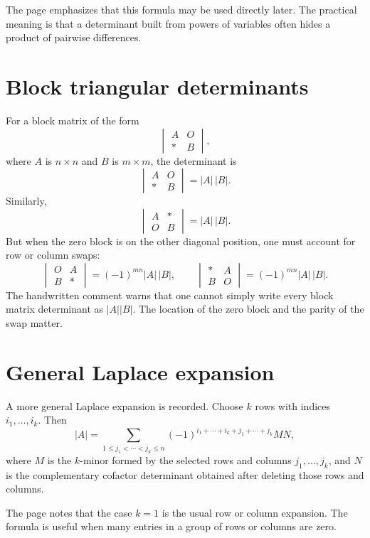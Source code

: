 The page emphasizes that this formula may be used directly later.  The practical meaning is that a determinant built from powers of variables often hides a product of pairwise differences.

\section{Block triangular determinants}

For a block matrix of the form
\[
  \begin{vmatrix}
  A&O\\
  *&B
  \end{vmatrix},
\]
where $A$ is $n\times n$ and $B$ is $m\times m$, the determinant is
\[
  \begin{vmatrix}
  A&O\\
  *&B
  \end{vmatrix}=|A|\,|B|.
\]
Similarly,
\[
  \begin{vmatrix}
  A&*\\
  O&B
  \end{vmatrix}=|A|\,|B|.
\]
But when the zero block is on the other diagonal position, one must account for row or column swaps:
\[
  \begin{vmatrix}
  O&A\\
  B&*
  \end{vmatrix}
  =(-1)^{mn}|A|\,|B|,
  \qquad
  \begin{vmatrix}
  *&A\\
  B&O
  \end{vmatrix}
  =(-1)^{mn}|A|\,|B|.
\]
The handwritten comment warns that one cannot simply write every block matrix determinant as $|A||B|$.  The location of the zero block and the parity of the swap matter.

\section{General Laplace expansion}

A more general Laplace expansion is recorded.  Choose $k$ rows with indices $i_1,\ldots,i_k$.  Then
\[
  |A|=\sum_{1\le j_1<\cdots<j_k\le n}
  (-1)^{i_1+\cdots+i_k+j_1+\cdots+j_k}MN,
\]
where $M$ is the $k$-minor formed by the selected rows and columns $j_1,\ldots,j_k$, and $N$ is the complementary cofactor determinant obtained after deleting those rows and columns.

The page notes that the case $k=1$ is the usual row or column expansion.  The formula is useful when many entries in a group of rows or columns are zero.

